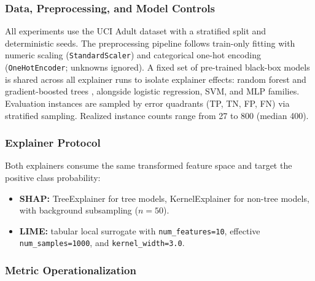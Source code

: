 \documentclass[10pt,a4paper,twoside]{article}
\begin{document}
\subsubsection{Data, Preprocessing, and Model Controls}
\label{sec:data}

All experiments use the UCI Adult dataset \citep{kohavi1996scaling,becker1996adult} with
a stratified split and deterministic seeds. The preprocessing pipeline
follows train-only fitting with numeric scaling (\texttt{StandardScaler})
and categorical one-hot encoding (\texttt{OneHotEncoder};
unknowns ignored). A fixed set of pre-trained black-box models is shared across all
explainer runs to isolate explainer effects: random forest \citep{breiman2001random} and
gradient-boosted trees \citep{chen2016xgboost}, alongside logistic
regression, SVM, and MLP families. Evaluation instances are sampled by
error quadrants (TP, TN, FP, FN) via stratified sampling. Realized
instance counts range from 27 to 800 (median 400).

\subsubsection{Explainer Protocol}
\label{sec:explainer_protocol}

Both explainers consume the same transformed feature space and target the
positive class probability:
\begin{itemize}[leftmargin=*]
\item \textbf{SHAP:} TreeExplainer for tree models, KernelExplainer for
non-tree models, with background subsampling ($n=50$).
\item \textbf{LIME:} tabular local surrogate with
\texttt{num\_features=10}, effective \texttt{num\_samples=1000}, and
\texttt{kernel\_width=3.0}.
\end{itemize}

\subsubsection{Metric Operationalization}
\label{sec:metrics}
\end{document}

